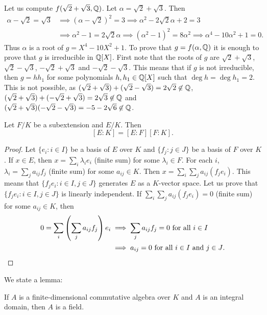 \begin{example}
	Let us compute 
	$f(\sqrt{2}+\sqrt{3},\mathbb{Q})$. Let $\alpha=\sqrt{2}+\sqrt{3}$. 
	Then 
	\begin{align*}
		\alpha-\sqrt{2}=\sqrt{3} & \implies 
		(\alpha-\sqrt{2})^2=3 \implies \alpha^2-2\sqrt{2}\alpha+2=3\\
		&\implies \alpha^2-1=2\sqrt{2}\alpha \implies
		(\alpha^2-1)^2=8\alpha^2\implies
		\alpha^4-10\alpha^2+1=0.
	\end{align*}
	Thus $\alpha$ is a root of $g=X^4-10X^2+1$. To prove that $g=f(\alpha,\mathbb{Q})$ 
	it is enough to prove that 
	$g$ is irreducible in $\mathbb{Q}[X]$. First note that 
	the roots
	of $g$ are $\sqrt{2}+\sqrt{3}$, $\sqrt{2}-\sqrt{3}$, 
	$-\sqrt{2}+\sqrt{3}$ and $-\sqrt{2}-\sqrt{3}$. This means that
	if $g$ is not irreducible, 
	then $g=hh_1$ for some polynomials $h,h_1\in\mathbb{Q}[X]$ such that
	$\deg h=\deg h_1=2$. This is not possible, as 
	$(\sqrt{2}+\sqrt{3})+(\sqrt{2}-\sqrt{3})=2\sqrt{2}\not\in\mathbb{Q}$, 
	$(\sqrt{2}+\sqrt{3})+(-\sqrt{2}+\sqrt{3})=2\sqrt{3}\not\in\mathbb{Q}$ and 
	$(\sqrt{2}+\sqrt{3})(-\sqrt{2}-\sqrt{3})=-5-2\sqrt{6}\not\in\mathbb{Q}$.
\end{example}

\begin{proposition}
	Let $F/K$ be a subextension and $E/K$. Then
	\[
	[E:K]=[E:F][F:K].
	\]
\end{proposition}

\begin{proof}
	Let $\{e_i:i\in I\}$ be a basis of $E$ over $K$
	and $\{f_j:j\in J\}$ be a basis of $F$ over $K$. If $x\in E$,
	then $x=\sum_i \lambda_ie_i$ (finite sum) 
	for some $\lambda_i\in F$. For each $i$, 
	$\lambda_i=\sum_j a_{ij}f_j$ (finite sum)
	for some $a_{ij}\in K$. Then 
	$x=\sum_i\sum_j a_{ij}(f_je_i)$. This means
	that $\{f_je_i:i\in I,j\in J\}$ generates
	$E$ as a $K$-vector space. Let us prove that 
	$\{f_je_i:i\in I,j\in J\}$
	is linearly independent. If $\sum_i\sum_j a_{ij}(f_je_i)=0$ (finite sum)
	for some $a_{ij}\in K$, 
	then
	\begin{align*}
		0=\sum_i\left(\sum_j a_{ij}f_j\right)e_i&\implies
		\sum_j a_{ij}f_j=0\text{ for all $i\in I$}\\
		&\implies 
		a_{ij}=0\text{ for all $i\in I$ and $j\in J$}.\qedhere
	\end{align*}
\end{proof}

We state a lemma:

\begin{lemma}
If $A$ is a finite-dimensional commutative algebra over $K$ 
and $A$ is an integral domain, then $A$ is a field. 
\end{lemma}

